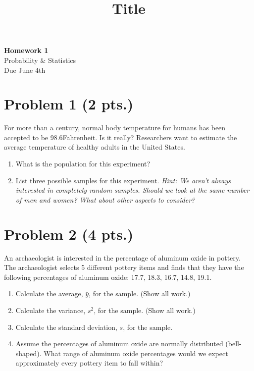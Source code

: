 \documentclass[11pt]{article}
\theoremstyle{definition}
\begin{document}
\title{Title}

\thispagestyle{empty}

\begin{center}
{\LARGE \bf Homework 1} \\
{\large Probability \& Statistics} \\
{\large Due June 4th}
\end{center}
\section*{Problem 1 (2 pts.)}

For more than a century, normal body temperature for humans has been accepted to be 98.6\degree \space Fahrenheit. Is it really? Researchers want to estimate the average temperature of healthy adults in the United States.

\begin{enumerate}
	\item What is the population for this experiment?
	\item List three possible samples for this experiment. \textit{Hint: We aren't always interested in completely random samples. Should we look at the same number of men and women? What about other aspects to consider?}
\end{enumerate}

\section*{Problem 2 (4 pts.)}

An archaeologist is interested in the percentage of aluminum oxide in pottery. The archaeologist selects 5 different pottery items and finds that they have the following percentages of aluminum oxide: 17.7, 18.3, 16.7, 14.8, 19.1.

\begin{enumerate}
	\item Calculate the average, $\bar{y}$, for the sample. (Show all work.)
	\item Calculate the variance, $s^2$, for the sample. (Show all work.)
	\item Calculate the standard deviation, $s$, for the sample.
	\item Assume the percentages of aluminum oxide are normally distributed (bell-shaped). What range of aluminum oxide percentages would we expect approximately every pottery item to fall within?
\end{enumerate}
\end{document}
